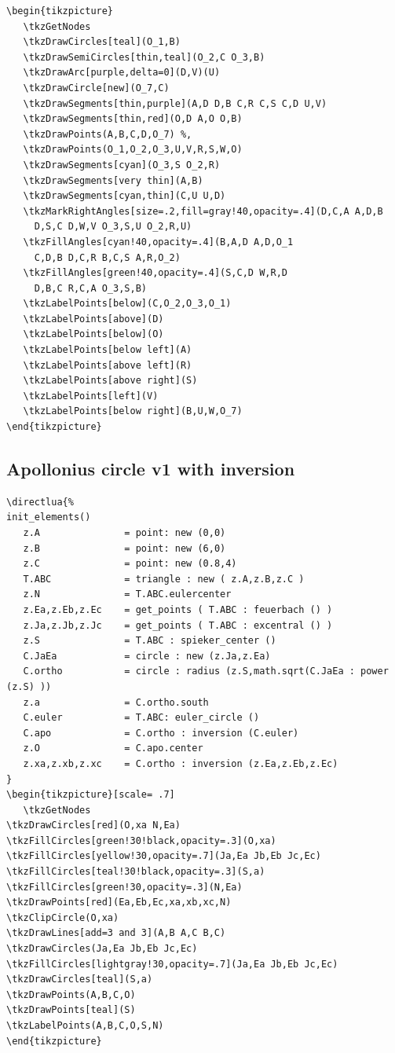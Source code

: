 \begin{Verbatim}
\begin{tikzpicture}
   \tkzGetNodes
   \tkzDrawCircles[teal](O_1,B)
   \tkzDrawSemiCircles[thin,teal](O_2,C O_3,B)
   \tkzDrawArc[purple,delta=0](D,V)(U)
   \tkzDrawCircle[new](O_7,C)
   \tkzDrawSegments[thin,purple](A,D D,B C,R C,S C,D U,V)
   \tkzDrawSegments[thin,red](O,D A,O O,B)
   \tkzDrawPoints(A,B,C,D,O_7) %,
   \tkzDrawPoints(O_1,O_2,O_3,U,V,R,S,W,O)
   \tkzDrawSegments[cyan](O_3,S O_2,R)
   \tkzDrawSegments[very thin](A,B)
   \tkzDrawSegments[cyan,thin](C,U U,D)
   \tkzMarkRightAngles[size=.2,fill=gray!40,opacity=.4](D,C,A A,D,B
     D,S,C D,W,V O_3,S,U O_2,R,U)
   \tkzFillAngles[cyan!40,opacity=.4](B,A,D A,D,O_1
     C,D,B D,C,R B,C,S A,R,O_2)
   \tkzFillAngles[green!40,opacity=.4](S,C,D W,R,D
     D,B,C R,C,A O_3,S,B)
   \tkzLabelPoints[below](C,O_2,O_3,O_1)
   \tkzLabelPoints[above](D)
   \tkzLabelPoints[below](O)
   \tkzLabelPoints[below left](A)
   \tkzLabelPoints[above left](R)
   \tkzLabelPoints[above right](S)
   \tkzLabelPoints[left](V)
   \tkzLabelPoints[below right](B,U,W,O_7)
\end{tikzpicture}
\end{Verbatim}

\subsection{Apollonius circle v1 with inversion} %
\label{sub:apollonius_circle_v1_with_inversion}
\begin{Verbatim}
\directlua{%
init_elements()
   z.A               = point: new (0,0)
   z.B               = point: new (6,0)
   z.C               = point: new (0.8,4)
   T.ABC             = triangle : new ( z.A,z.B,z.C )
   z.N               = T.ABC.eulercenter
   z.Ea,z.Eb,z.Ec    = get_points ( T.ABC : feuerbach () )
   z.Ja,z.Jb,z.Jc    = get_points ( T.ABC : excentral () )
   z.S               = T.ABC : spieker_center ()
   C.JaEa            = circle : new (z.Ja,z.Ea)
   C.ortho           = circle : radius (z.S,math.sqrt(C.JaEa : power (z.S) ))
   z.a               = C.ortho.south
   C.euler           = T.ABC: euler_circle ()
   C.apo             = C.ortho : inversion (C.euler)
   z.O               = C.apo.center
   z.xa,z.xb,z.xc    = C.ortho : inversion (z.Ea,z.Eb,z.Ec)
}
\begin{tikzpicture}[scale= .7]
   \tkzGetNodes
\tkzDrawCircles[red](O,xa N,Ea)
\tkzFillCircles[green!30!black,opacity=.3](O,xa)
\tkzFillCircles[yellow!30,opacity=.7](Ja,Ea Jb,Eb Jc,Ec)
\tkzFillCircles[teal!30!black,opacity=.3](S,a)
\tkzFillCircles[green!30,opacity=.3](N,Ea)
\tkzDrawPoints[red](Ea,Eb,Ec,xa,xb,xc,N)
\tkzClipCircle(O,xa)
\tkzDrawLines[add=3 and 3](A,B A,C B,C)
\tkzDrawCircles(Ja,Ea Jb,Eb Jc,Ec)
\tkzFillCircles[lightgray!30,opacity=.7](Ja,Ea Jb,Eb Jc,Ec)
\tkzDrawCircles[teal](S,a)
\tkzDrawPoints(A,B,C,O)
\tkzDrawPoints[teal](S)
\tkzLabelPoints(A,B,C,O,S,N)
\end{tikzpicture}
\end{Verbatim}

